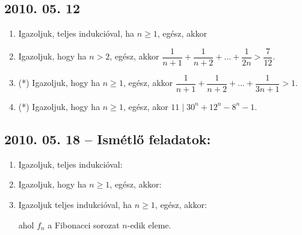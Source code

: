 \subsection*{2010. 05. 12}
\begin{enumerate}
\item Igazoljuk, teljes indukcióval, ha $n\ge1$, egész, akkor
\item Igazoljuk, hogy ha $n>2$, egész, akkor
$\dfrac{1}{n+1}+\dfrac{1}{n+2}+...+\dfrac{1}{2n}>\dfrac{7}{12}$.
\item (*) Igazoljuk, hogy ha $n\ge1$, egész, akkor
$\dfrac{1}{n+1}+\dfrac{1}{n+2}+...+\dfrac{1}{3n+1}>1$.
\item (*) Igazoljuk, hogy ha $n\ge1$, egész, akor $11\mid 30^{n}+12^{n}-8^{n}-1$.
\end{enumerate}


\subsection*{2010. 05. 18 -- Ismétlő feladatok:}
\begin{enumerate}
\item Igazoljuk, teljes indukcióval:
\item Igazoljuk, hogy ha $n\ge1$, egész, akkor:
\item Igazoljuk teljes indukcióval, ha $n\ge1$, egész, akkor:
ahol $f_n$ a Fibonacci sorozat $n$-edik eleme.
\end{enumerate}


